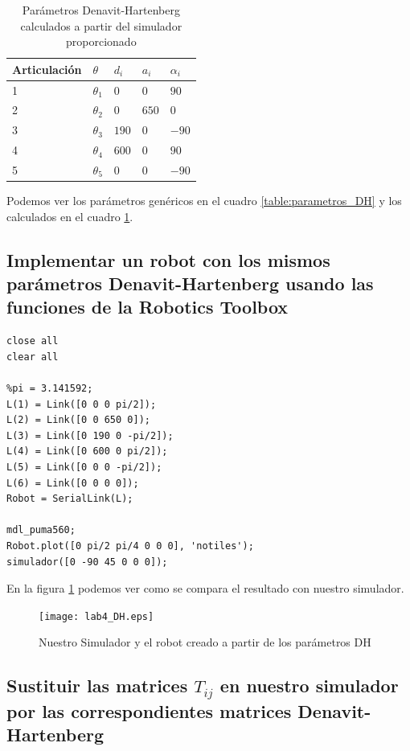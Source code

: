 \documentclass{article}
\newcommand{\fref}[1]{figura \ref{fig:#1}}
\newcommand{\cref}[1]{cuadro \ref{table:#1}}
\begin{document}
\begin{table}[h]
\centering
\caption{Parámetros Denavit-Hartenberg calculados a partir del simulador proporcionado}
\label{table:parametros_DH2}
\begin{tabular}{l|llll}
Articulación & $\theta$   & $d_i$  & $a_i$   & $\alpha_i$ \\ \hline
1            & $\theta_1$ & $0$  & $0$     & $90$       \\
2            & $\theta_2$ & $0$  & $650$   & $0$         \\
3            & $\theta_3$ & $190$    & $0$  & $-90$        \\
4            & $\theta_4$ & $600$  & $0$     & $90$       \\
5            & $\theta_5$ & $0$    & $0$     & $-90$       
\end{tabular}
\end{table}

Podemos ver los parámetros genéricos en el \cref{parametros_DH} y los calculados en el \cref{parametros_DH2}.

\subsection{Implementar un robot con los mismos parámetros Denavit-Hartenberg usando las funciones de la Robotics Toolbox}

\begin{lstlisting}[frame=single]
close all
clear all

%pi = 3.141592;
L(1) = Link([0 0 0 pi/2]);
L(2) = Link([0 0 650 0]);
L(3) = Link([0 190 0 -pi/2]);
L(4) = Link([0 600 0 pi/2]);
L(5) = Link([0 0 0 -pi/2]);
L(6) = Link([0 0 0 0]);
Robot = SerialLink(L);

mdl_puma560;
Robot.plot([0 pi/2 pi/4 0 0 0], 'notiles');
simulador([0 -90 45 0 0 0]);
\end{lstlisting}

En la \fref{lab4_DH} podemos ver como se compara el resultado con nuestro simulador.

\begin{figure}[h]
\centering
\texttt{[image: lab4\_DH.eps]}
\caption{Nuestro Simulador y el robot creado a partir de los parámetros DH}
\label{fig:lab4_DH}
\end{figure}

\subsection{Sustituir las matrices $T_{ij}$ en nuestro simulador por las correspondientes matrices Denavit-Hartenberg}
\end{document}

